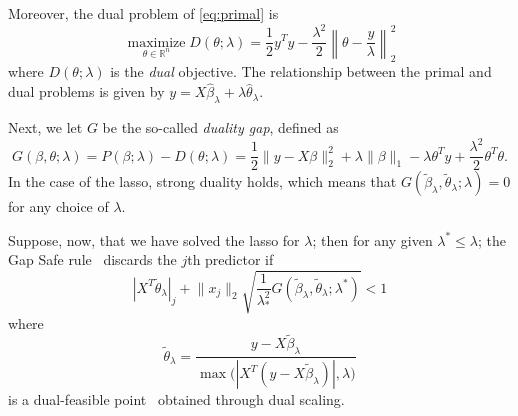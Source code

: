 \documentclass[b5paper,10pt,abstractoff,DIV=calc,headings=normal,twoside]{scrartcl}
\theoremstyle{plain}
\theoremstyle{definition}
\theoremstyle{remark}
\DeclareMathOperator{\sign}{sign}
\begin{document}
Moreover, the dual problem of \eqref{eq:primal} is
\begin{equation}
  \label{eq:dual}
  \operatorname*{maximize}_{\theta \in \mathbb{R}^n} D(\theta; \lambda) =
  \frac 12 y^T y - \frac{\lambda^2}{2} \left\lVert \theta
  - \frac y \lambda \right\rVert_2^2
\end{equation}
where \(D(\theta; \lambda)\) is the \emph{dual} objective.
The relationship between the primal and dual problems is given by
\(y = X\hat\beta_\lambda + \lambda \hat\theta_\lambda.\)

Next, we let \(G\) be the so-called \emph{duality gap}, defined as
\begin{equation}
  G(\beta, \theta; \lambda)
  = P(\beta; \lambda) - D(\theta; \lambda)
  =
  \frac 12 \lVert y - X\beta\rVert_2^2 + \lambda \lVert \beta \rVert_1
  - \lambda \theta^T y + \frac{\lambda^2}{2} \theta^T \theta.
\end{equation}
In the case of the lasso, strong duality holds, which means that
\(G(\tilde\beta_\lambda, \tilde\theta_\lambda; \lambda) = 0\) for any
choice of \(\lambda\).

Suppose, now, that we have solved the lasso for \(\lambda\); then
for any given \(\lambda^* \leq \lambda\);
the Gap Safe rule~\citep{ndiaye2017} discards the \(j\)th
predictor if
\begin{equation}
  \label{eq:gap-safe-rule}
  |X^T \tilde \theta_\lambda|_j + \lVert x_j\rVert_2
  \sqrt{\frac{1}{\lambda_*^2}
    G(\tilde \beta_\lambda, \tilde \theta_\lambda; \lambda^*)}
  < 1
\end{equation}
where
\[
  \tilde\theta_\lambda = \frac{y - X\tilde\beta_\lambda}{
    \max\big( |X^T(y - X\tilde\beta_\lambda)|, \lambda\big)}
\]
is a dual-feasible point~\cite{ndiaye2017} obtained through dual scaling.
\end{document}

